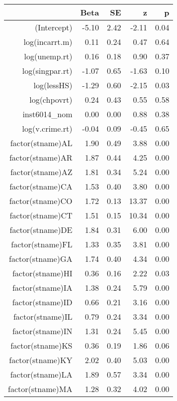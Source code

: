\begin{table}[ht]
\centering
\begin{tabular}{rrrrr}
  \hline
 & Beta & SE & z & p \\ 
  \hline
(Intercept) & -5.10 & 2.42 & -2.11 & 0.04 \\ 
  log(incarrt.m) & 0.11 & 0.24 & 0.47 & 0.64 \\ 
  log(unemp.rt) & 0.16 & 0.18 & 0.90 & 0.37 \\ 
  log(singpar.rt) & -1.07 & 0.65 & -1.63 & 0.10 \\ 
  log(lessHS) & -1.29 & 0.60 & -2.15 & 0.03 \\ 
  log(chpovrt) & 0.24 & 0.43 & 0.55 & 0.58 \\ 
  inst6014\_nom & 0.00 & 0.00 & 0.88 & 0.38 \\ 
  log(v.crime.rt) & -0.04 & 0.09 & -0.45 & 0.65 \\ 
  factor(stname)AL & 1.90 & 0.49 & 3.88 & 0.00 \\ 
  factor(stname)AR & 1.87 & 0.44 & 4.25 & 0.00 \\ 
  factor(stname)AZ & 1.81 & 0.34 & 5.24 & 0.00 \\ 
  factor(stname)CA & 1.53 & 0.40 & 3.80 & 0.00 \\ 
  factor(stname)CO & 1.72 & 0.13 & 13.37 & 0.00 \\ 
  factor(stname)CT & 1.51 & 0.15 & 10.34 & 0.00 \\ 
  factor(stname)DE & 1.84 & 0.31 & 6.00 & 0.00 \\ 
  factor(stname)FL & 1.33 & 0.35 & 3.81 & 0.00 \\ 
  factor(stname)GA & 1.74 & 0.40 & 4.34 & 0.00 \\ 
  factor(stname)HI & 0.36 & 0.16 & 2.22 & 0.03 \\ 
  factor(stname)IA & 1.38 & 0.24 & 5.79 & 0.00 \\ 
  factor(stname)ID & 0.66 & 0.21 & 3.16 & 0.00 \\ 
  factor(stname)IL & 0.79 & 0.24 & 3.34 & 0.00 \\ 
  factor(stname)IN & 1.31 & 0.24 & 5.45 & 0.00 \\ 
  factor(stname)KS & 0.36 & 0.19 & 1.86 & 0.06 \\ 
  factor(stname)KY & 2.02 & 0.40 & 5.03 & 0.00 \\ 
  factor(stname)LA & 1.89 & 0.57 & 3.34 & 0.00 \\ 
  factor(stname)MA & 1.28 & 0.32 & 4.02 & 0.00 \\ 

\end{tabular}
\end{table}
